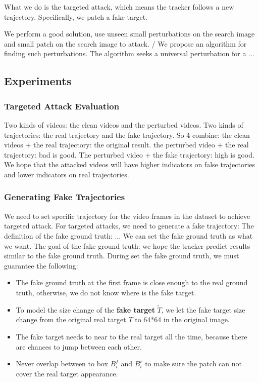 \documentclass{article}
\begin{document}
What we do is the targeted attack, which means the tracker follows a new trajectory. Specifically, we patch a fake target.

We perform a good solution, use unseen small perturbations on the search image and small patch on the search image to attack. / We propose an algorithm for finding such perturbations. The algorithm seeks a universal perturbation for a ...

\subsection{Experiments}

\subsubsection{Targeted Attack Evaluation}

Two kinds of videos: the clean videos and the perturbed videos.
Two kinds of trajectories: the real trajectory and the fake trajectory.
So 4 combine: the clean videos + the real trajectory: the original result.
the perturbed video + the real trajectory: bad is good.
The perturbed video + the fake trajectory: high is good.
We hope that the attacked videos will have higher indicators on false trajectories and lower indicators on real trajectories.

\subsubsection{Generating Fake Trajectories}

We need to set specific trajectory for the video frames in the dataset to achieve targeted attack.
For targeted attacks, we need to generate a fake trajectory: The definition of the fake ground truth: ... We can set the fake ground truth as what we want.
The goal of the fake ground truth: we hope the tracker predict results similar to the fake ground truth.
During set the fake ground truth, we must guarantee the following:

\begin{itemize}
\item The fake ground truth at the first frame is close enough to the real ground truth, otherwise, we do not know where is the fake target.
\item To model the size change of the \textbf{fake target} $\tilde T$, we let the fake target size change from the original real target $T$ to 64*64 in the original image.
\item The fake target needs to near to the real target all the time, because there are chances to jump between each other.
\item Never overlap between to box $B^f_i$ and $B^r_i$ to make sure the patch can not cover the real target appearance.
\end{itemize}
\end{document}
